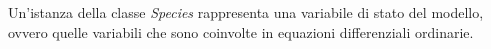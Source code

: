 
Un'istanza della classe \textit{Species} rappresenta una variabile di stato del modello, ovvero quelle variabili che sono coinvolte in equazioni differenziali ordinarie.